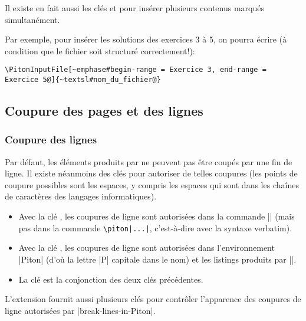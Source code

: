 \documentclass[dvipsnames,svgnames]{article}
\begin{document}
\bigskip
{}  Il existe en fait aussi les clés
 et  pour insérer plusieurs contenus marqués
simultanément.

Par exemple, pour insérer les solutions des exercices 3 à 5, on pourra écrire (à condition
que le fichier soit structuré correctement!):

\begin{Verbatim}
\PitonInputFile[~emphase#begin-range = Exercice 3, end-range = Exercice 5@]{~textsl#nom_du_fichier@}
\end{Verbatim}




\subsection{Coupure des pages et des lignes}

\label{breakable}

\subsubsection{Coupure des lignes}

\label{line-breaks}

Par défaut, les éléments produits par  ne peuvent pas être coupés par une fin
de ligne. Il existe néanmoins des clés pour autoriser de telles coupures (les points de
coupure possibles sont les espaces, y compris les espaces qui sont dans les chaînes de
caractères des langages informatiques).
\begin{itemize}
\item {} Avec la clé
, les coupures de ligne sont autorisées dans la commande
|| (mais pas dans la commande \verb+\piton|...|+, c'est-à-dire avec la syntaxe
verbatim).

\item {} Avec la clé
, les coupures de ligne sont autorisées dans
l'environnement |{Piton}| (d'où la lettre |P| capitale dans le nom) et les listings
produits par |\PitonInputFile|.

\item {} La clé  est la conjonction des deux clés
précédentes.
\end{itemize}

\medskip
L'extension  fournit aussi plusieurs clés pour contrôler l'apparence des
coupures de ligne autorisées par |break-lines-in-Piton|.
\end{document}
